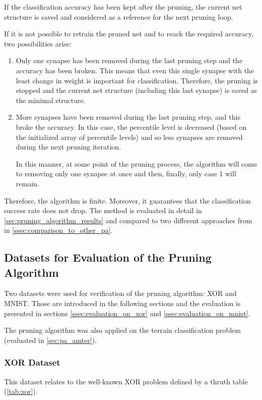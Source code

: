 If the classification accuracy has been kept after the pruning, the current net structure is saved and considered as a reference for the next pruning loop.

If it is not possible to retrain the pruned net and to reach the required accuracy, two possibilities arise:

\begin{enumerate}
\item Only one synapse has been removed during the last pruning step and the accuracy has been broken. This means that even this single synapse with the least change in weight is important for classification. Therefore, the pruning is stopped and the current net structure (including this last synapse) is saved as the minimal structure.
\item More synapses have been removed during the last pruning step, and this broke the accuracy. In this case, the percentile level is decreased (based on the initialized array of percentile levels) and so less synapses are removed during the next pruning iteration.

In this manner, at some point of the pruning process, the algorithm will come to removing only one synapse at once and then, finally, only case 1 will remain.
\end{enumerate}

Therefore, the algorithm is finite. Moreover, it guarantees that the classification success rate does not drop. The method is evaluated in detail in \cref{sec:pruning_algorithm_results} and compared to two different approaches from \citep{article:10:pa} in \cref{ssec:comparison_to_other_pa}.

\subsection{Datasets for Evaluation of the Pruning Algorithm} \label{ssec:testing_datasets}
Two datasets were used for verification of the pruning algorithm: XOR and MNIST. Those are introduced in the following sections and the evaluation is presented in sections \ref{ssec:evaluation_on_xor} and \ref{ssec:evaluation_on_mnist}.

The pruning algorithm was also applied on the terrain classification problem (evaluated in \cref{sec:pa_amter}).

\subsubsection*{XOR Dataset}
This dataset relates to the well-known XOR problem defined by a thruth table (\cref{tab:xor}).

